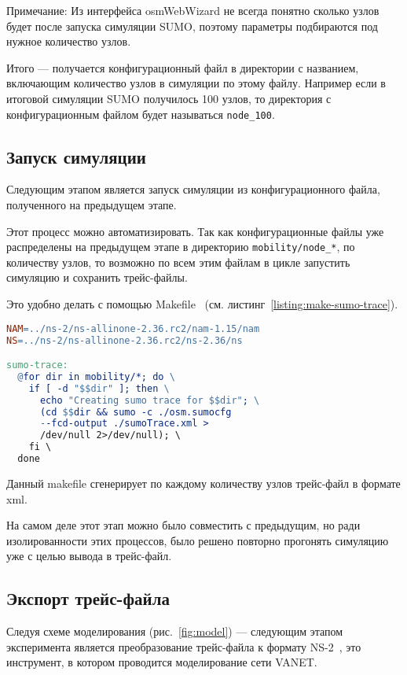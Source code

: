 Примечание: Из интерфейса osmWebWizard не всегда понятно сколько узлов будет после запуска симуляции SUMO, поэтому параметры подбираются под нужное количество узлов.

Итого --- получается конфигурационный файл в директории с названием, включающим количество узлов в симуляции по этому файлу. Например если в итоговой симуляции SUMO получилось 100 узлов, то директория с конфигурационным файлом будет называться \verb|node_100|.

\subsection{Запуск симуляции}

Следующим этапом является запуск симуляции из конфигурационного файла, полученного на предыдущем этапе. 

Этот процесс можно автоматизировать. Так как конфигурационные файлы уже распределены на предыдущем этапе в директорию \verb|mobility/node_*|, по количеству узлов, то возможно по всем этим файлам в цикле запустить симуляцию и сохранить трейс-файлы.

Это удобно делать с помощью Makefile~\cite{makefile} (см. листинг~\ref{listing:make-sumo-trace}).

\begin{lstlisting}[language=make, style=mystyle, caption=Makefile для запуска симуляции мобильности, label=listing:make-sumo-trace]
NAM=../ns-2/ns-allinone-2.36.rc2/nam-1.15/nam
NS=../ns-2/ns-allinone-2.36.rc2/ns-2.36/ns

sumo-trace:
  @for dir in mobility/*; do \
    if [ -d "$$dir" ]; then \
      echo "Creating sumo trace for $$dir"; \
      (cd $$dir && sumo -c ./osm.sumocfg  
      --fcd-output ./sumoTrace.xml > 
      /dev/null 2>/dev/null); \
    fi \
  done

\end{lstlisting}

Данный makefile сгенерирует по каждому количеству узлов трейс-файл в формате xml.

На самом деле этот этап можно было совместить с предыдущим, но ради изолированности этих процессов, было решено повторно прогонять симуляцию уже с целью вывода в трейс-файл.

\subsection{Экспорт трейс-файла}

Следуя схеме моделирования (рис.~\ref{fig:model}) --- следующим этапом эксперимента является преобразование трейс-файла к формату NS-2~\cite{ns2_docs}, это инструмент, в котором проводится моделирование сети VANET.

